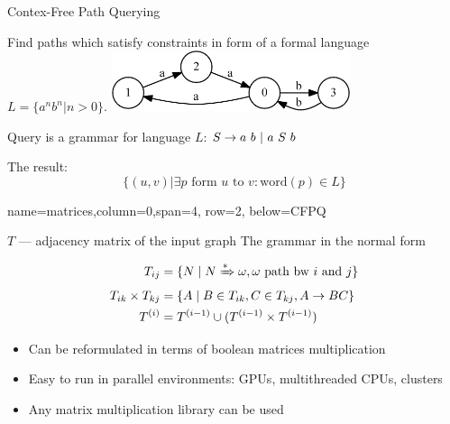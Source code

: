 \documentclass[a0paper,portrait]{baposter}
\begin{document}
\begin{poster}
\begin{posterbox}[name=CFPQ,column=0,row=0, span=4]{Contex-Free Path Querying}

  Find paths which satisfy constraints in form of a formal language $L=\{a^n b^n | n > 0\}$.
  	\includegraphics[width=7cm]{example_graph_transparent.png}

  	Query is a grammar for language $L$: $S  \rightarrow a  \ b \ | \ a \ S \ b  \\$

  The result: $$ \{(u,v) | \exists p \text{ form } u \text{ to } v: \text{word}(p) \in L\} $$

\end{posterbox}

{name=matrices,column=0,span=4, row=2, below=CFPQ}%
{

$T$ --- adjacency matrix of the input graph
The grammar in the normal form
\vspace{-0.5cm}

\begin{align*}
T_{ij} &=\{ N \mid N \xRightarrow[]{*} \omega,  \omega \text{ path bw } i \text{ and } j \} \\
T_{ik} \times T_{kj} &= \{ A \mid B \in T_{ik}, C \in T_{kj}, A \rightarrow B C \} \\
T^{(i)} &= T^{(i-1)} \cup (T^{(i-1)} \times T^{(i-1)})
\end{align*}

\begin{itemize}
  \item Can be reformulated in terms of boolean matrices multiplication
  \item Easy to run in parallel environments: GPUs, multithreaded CPUs, clusters
  \item Any matrix multiplication library can be used
\end{itemize}
}



\end{poster}
\end{document}
